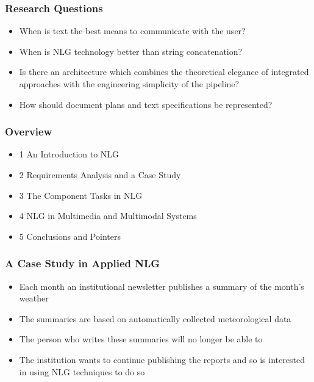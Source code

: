 \documentclass[compress,color=usenames]{beamer}
\begin{document}
\begin{frame}
\frametitle{Research Questions}

\label{f62}
\begin{itemize}
\item { {When is text the best means to communicate with the user?}}
\item { {When is NLG technology better than string concatenation?}}
\item { {Is there an architecture which combines the theoretical elegance of integrated approaches with the engineering simplicity of the pipeline?}}
\item { {How should document plans and text specifications be represented?}}
\end{itemize}

\end{frame}

\begin{frame}
\frametitle{Overview}

\label{f64}
\begin{itemize}
\item { {1 An Introduction to NLG}}
\item { {2 Requirements Analysis and a Case Study}}
\item { {3 The Component Tasks in NLG}}
\item { {4 NLG in Multimedia and Multimodal Systems}}
\item { {5 Conclusions and Pointers}}
\end{itemize}

\end{frame}

\begin{frame}
\frametitle{A Case Study in Applied NLG}

\begin{itemize}
\item { {Each month an institutional newsletter publishes a summary of the month's weather}}
\item { {The summaries are based on automatically collected meteorological data}}
\item { {The person who writes these summaries will no longer be able to}}
\item { {The institution wants to continue publishing the reports and so is interested in using NLG techniques to do so}}
\end{itemize}

\end{frame}
\end{document}
